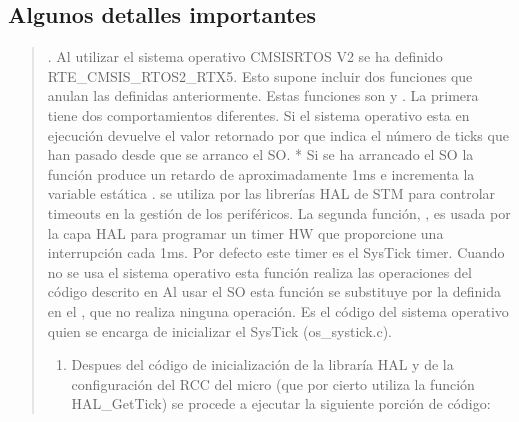 \documentclass[letterpaper,10pt,english]{sphinxmanual}
\begin{document}
\subsection{Algunos detalles importantes}
\label{\detokenize{cmsis-rtos:algunos-detalles-importantes}}\begin{quote}

. Al utilizar el sistema operativo CMSIS\sphinxhyphen{}RTOS V2 se ha definido RTE\_CMSIS\_RTOS2\_RTX5. Esto supone incluir dos funciones que anulan las definidas anteriormente.
Estas funciones son    y . La primera tiene dos comportamientos diferentes. Si el sistema operativo esta en ejecución devuelve el valor retornado por  que indica el número de ticks que han pasado desde que se arranco el SO.     * Si  se ha arrancado el SO la función produce un retardo de aproximadamente 1ms e incrementa la variable estática .
 se utiliza por las librerías HAL de STM para controlar timeouts en la gestión de los periféricos. La segunda función, , es usada por la capa HAL para programar un timer HW que proporcione una interrupción cada 1ms. Por defecto este timer es el SysTick timer.
Cuando no se usa el sistema operativo esta función realiza las operaciones del código descrito en  Al usar el SO esta función se substituye por la definida en el , que no realiza ninguna operación.
Es el código del sistema operativo quien se encarga de inicializar el SysTick (os\_systick.c).
\begin{enumerate}
%
\setcounter{enumi}{1}
\item {} 
\sphinxAtStartPar
Despues del código de inicialización de la libraría HAL y de la configuración del RCC del micro (que por cierto utiliza la función HAL\_GetTick) se procede a ejecutar la siguiente porción de código:

\end{enumerate}

\begin{sphinxVerbatim}[commandchars=\\\{\},numbers=left,firstnumber=1,stepnumber=1]


\end{sphinxVerbatim}
\end{quote}
\end{document}
